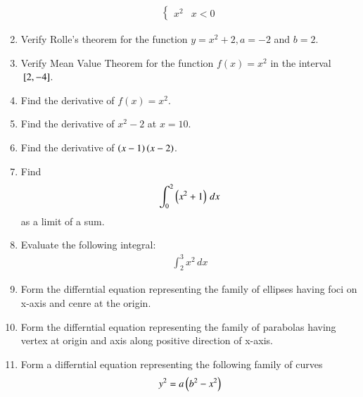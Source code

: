 \begin{enumerate}[label=\arabic*.,ref=\thesubsection.\theenumi]
\begin{align}
\begin{cases}
x^2 & x < 0
\end{cases}
\end{align}
%
\item Verify Rolle's theorem for the function $y = x^2+2, a = -2$ and $b = 2$.
\item Verify Mean Value Theorem for the function $f(x) = x^2$ in the interval ${}\left[2,-4\right]$.
\item Find the derivative of $f(x) = x^2$.
\item Find the derivative of $ x^2 - 2$ at $x = 10$.
\item Find the derivative of $ \left(x-1\right) \left(x-2\right)$.
%
%
\item Find 
\begin{align}
\int_{0}^{2} \left(x^2+1\right)\,dx
\end{align}
%
as a limit of a sum.
\item Evaluate the following integral:
%
\begin{align}
\int_{2}^{3}x^2 \,dx
\end{align}
%
\item Form the differntial equation representing the family of ellipses having foci on x-axis and cenre at the origin.
%
\item Form the differntial equation representing the family of parabolas having vertex at origin and axis along positive direction of x-axis.
\item Form a differntial equation representing the following family of curves
%
\begin{align}
y^2 = a\left(b^2-x^2\right)
\end{align}
%
\end{enumerate}
